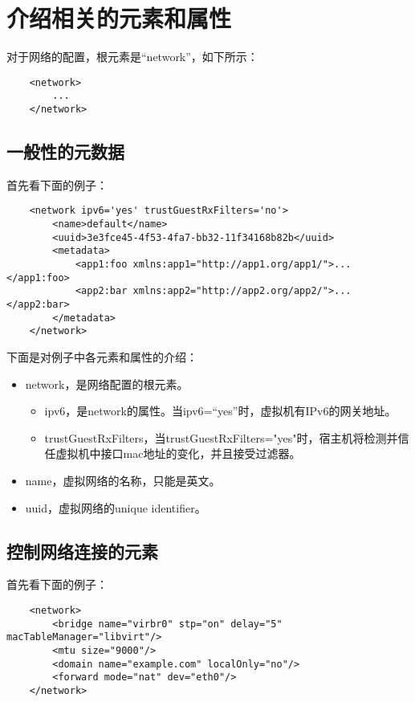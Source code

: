 \documentclass[a4paper,left=2.5cm,right=2.5cm,11pt]{article}
\begin{document}
\tableofcontents

\clearpage

\section{介绍相关的元素和属性}
	对于网络的配置，根元素是“network”，如下所示：
	\begin{lstlisting}
	<network>
		...
	</network>
	\end{lstlisting}

\subsection{一般性的元数据}
	首先看下面的例子：
	\begin{lstlisting}
	<network ipv6='yes' trustGuestRxFilters='no'>
		<name>default</name>
		<uuid>3e3fce45-4f53-4fa7-bb32-11f34168b82b</uuid>
		<metadata>
			<app1:foo xmlns:app1="http://app1.org/app1/">...</app1:foo>
			<app2:bar xmlns:app2="http://app2.org/app2/">...</app2:bar>
		</metadata>
	</network>
	\end{lstlisting}

	下面是对例子中各元素和属性的介绍：
	\begin{itemize}
		\item network，是网络配置的根元素。
		\begin{itemize}
			\item ipv6，是network的属性。当ipv6=“yes”时，虚拟机有IPv6的网关地址。
			\item trustGuestRxFilters，当trustGuestRxFilters="yes"时，宿主机将检测并信任虚拟机中接口mac地址的变化，并且接受过滤器。
		\end{itemize}
		\item name，虚拟网络的名称，只能是英文。
		\item uuid，虚拟网络的unique identifier。
	\end{itemize}

\subsection{控制网络连接的元素}
	首先看下面的例子：
	\begin{lstlisting}
	<network>
		<bridge name="virbr0" stp="on" delay="5" macTableManager="libvirt"/>
		<mtu size="9000"/>
		<domain name="example.com" localOnly="no"/>
		<forward mode="nat" dev="eth0"/>
	</network>
	\end{lstlisting}
\end{document}
